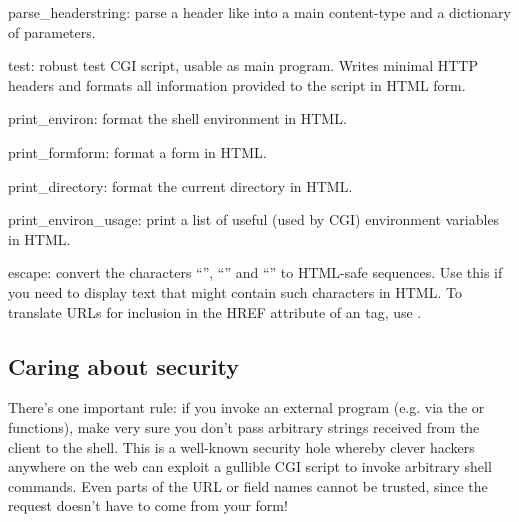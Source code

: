 \begin{funcdesc}{parse_header}{string}: parse a header like  into a main
content-type and a dictionary of parameters.
\end{funcdesc}

\begin{funcdesc}{test}{}: robust test CGI script, usable as main program.
    Writes minimal HTTP headers and formats all information provided to
    the script in HTML form.
\end{funcdesc}

\begin{funcdesc}{print_environ}{}: format the shell environment in HTML.
\end{funcdesc}

\begin{funcdesc}{print_form}{form}: format a form in HTML.
\end{funcdesc}

\begin{funcdesc}{print_directory}{}: format the current directory in HTML.
\end{funcdesc}

\begin{funcdesc}{print_environ_usage}{}: print a list of useful (used by CGI) environment variables in
HTML.
\end{funcdesc}

\begin{funcdesc}{escape}{}: convert the characters ``\code{\&}'', ``\code{<}'' and ``\code{>}'' to HTML-safe
sequences.  Use this if you need to display text that might contain
such characters in HTML.  To translate URLs for inclusion in the HREF
attribute of an  tag, use .
\end{funcdesc}


\subsection{Caring about security}

There's one important rule: if you invoke an external program (e.g.
via the  or  functions), make very sure you don't
pass arbitrary strings received from the client to the shell.  This is
a well-known security hole whereby clever hackers anywhere on the web
can exploit a gullible CGI script to invoke arbitrary shell commands.
Even parts of the URL or field names cannot be trusted, since the
request doesn't have to come from your form!

